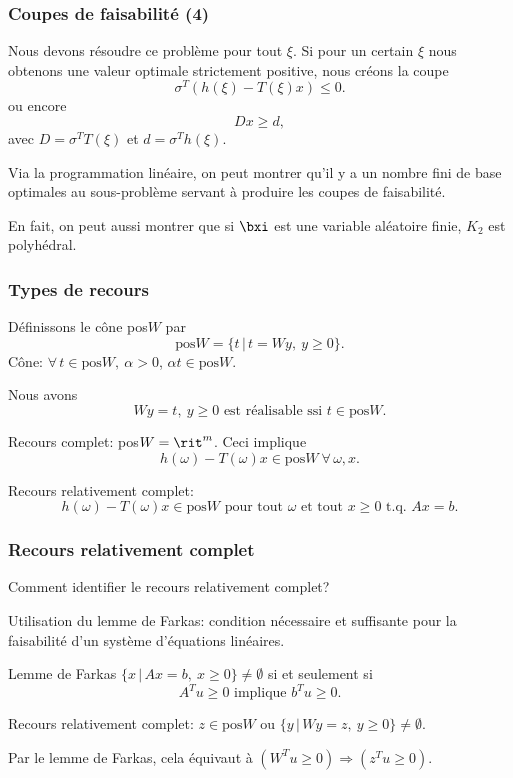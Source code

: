 \begin{frame}
	\frametitle{Coupes de faisabilité (4)}
	
	Nous devons résoudre ce problème pour tout $\xi$.
	Si pour un certain $\xi$ nous obtenons une valeur optimale strictement
	positive, nous créons la coupe
	\[
	\sigma^T(h(\xi)-T(\xi)x) \leq 0.
	\]
	ou encore
	\[
	Dx \geq d,
	\]
	avec $D = \sigma^TT(\xi)$ et $d = \sigma^Th(\xi)$.
	
	\mbox{}
	
	Via la programmation linéaire, on peut montrer qu'il y a un nombre
	fini de base optimales au sous-problème servant à produire les coupes
	de faisabilité.
	\mbox{}
	
	En fait, on peut aussi montrer que si $\bxi$ est une variable aléatoire
	finie, $K_2$ est polyhédral.
	
\end{frame}

\begin{frame}
	\frametitle{Types de recours}
	
	Définissons le cône pos$W$ par
	\[
	\mbox{pos}W = \lbrace t \,|\, t = Wy,\ y \geq 0 \rbrace.
	\]
	Cône: $\forall\, t \in \mbox{pos}W,\ \alpha > 0$, $\alpha t \in  \mbox{pos}W$.
	
	\mbox{}
	
	Nous avons
	\[
	Wy = t,\ y \geq 0 \mbox{ est réalisable ssi } t \in \mbox{pos}W.
	\]
	
	\mbox{}
	
	{\red Recours complet}: {\blue pos$W = \rit^m$}.
	Ceci implique
	\[
	h(\omega) - T(\omega)x \in \mbox{pos}W \ \forall\, \omega, x.
	\]
	
	\mbox{}
	
	{\red Recours relativement complet}:
	\[
	h(\omega) - T(\omega)x \in \mbox{pos}W \mbox{ pour tout } \omega \mbox{ et tout
	}x \geq 0 \mbox{ t.q. } Ax=b.
	\]
	
\end{frame}

\begin{frame}
	\frametitle{Recours relativement complet}
	
	Comment identifier le recours relativement complet?
	
	\mbox{}
	
	Utilisation du lemme de Farkas: condition nécessaire et suffisante
	pour la faisabilité d'un système d'équations linéaires.
	
	\begin{block}{Lemme de Farkas}
		$\lbrace x \,|\,  Ax = b,\ x \geq 0 \rbrace \ne \emptyset$
		si et seulement si
		\[
		A^Tu \geq 0 \mbox{ implique } b^Tu \geq 0.
		\]
	\end{block}
	
	\mbox{}
	
	Recours relativement complet: $z \in \mbox{pos} W$ ou $\lbrace y \,|\,
	Wy = z,\ y \geq 0\rbrace \ne \emptyset$.
	
	Par le lemme de Farkas, cela équivaut à
	$(W^Tu \geq 0) \Rightarrow (z^Tu \geq 0).$
	
\end{frame}


